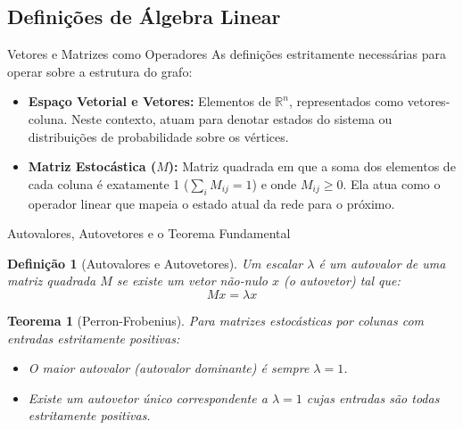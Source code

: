 \documentclass[aspectratio=1610,10pt]{beamer}
\newtheorem{teorema}{Teorema}
\newtheorem{definicao}{Definição}
\begin{document}
  \subsection{Definições de Álgebra Linear}

    \begin{frame}{Vetores e Matrizes como Operadores}
      As definições estritamente necessárias para operar sobre a estrutura do grafo:
      \vfill
      \begin{itemize}
        \setlength{\itemsep}{\medskipamount}
        \item \textbf{Espaço Vetorial e Vetores:} Elementos de $\mathbb{R}^n$, representados como vetores-coluna. Neste contexto, atuam para denotar estados do sistema ou distribuições de probabilidade sobre os vértices.
        \item \textbf{Matriz Estocástica ($M$):} Matriz quadrada em que a soma dos elementos de cada coluna é exatamente 1 ($\sum_{i} M_{ij} = 1$) e onde $M_{ij} \ge 0$. Ela atua como o operador linear que mapeia o estado atual da rede para o próximo.
      \end{itemize}
    \end{frame}

    \begin{frame}{Autovalores, Autovetores e o Teorema Fundamental}
      
      \begin{definicao}[Autovalores e Autovetores]
        Um escalar $\lambda$ é um autovalor de uma matriz quadrada $M$ se existe um vetor não-nulo $x$ (o autovetor) tal que:
        \begin{equation}
            M x = \lambda x
        \end{equation}
      \end{definicao}
      
      \vfill
      
      \begin{teorema}[Perron-Frobenius]
        Para matrizes estocásticas por colunas com entradas estritamente positivas:
        \begin{itemize}
            \item O maior autovalor (autovalor dominante) é sempre $\lambda = 1$.
            \item Existe um autovetor único correspondente a $\lambda = 1$ cujas entradas são todas estritamente positivas.
        \end{itemize}
      \end{teorema}
      
    \end{frame}
\end{document}
